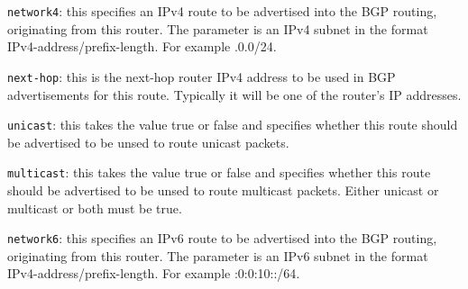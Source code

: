 \begin{description}
\begin{description}
\end{description}
\item{\tt network4}: this specifies an IPv4 route to be advertised
  into the BGP routing, originating from this router.  The parameter
  is an IPv4 subnet in the format IPv4-address/prefix-length.  For
  example {.0.0/24}.
\begin{description}
\item{\tt next-hop}: this is the next-hop router IPv4 address to be used
  in BGP advertisements for this route.  Typically it will be one of
  the router's IP addresses.
\item{\tt unicast}: this takes the value {\stt true} or {\stt false}
and specifies whether this route should be advertised to be unsed to
route unicast packets.
\item{\tt multicast}: this takes the value {\stt true} or {\stt false}
and specifies whether this route should be advertised to be unsed to
route multicast packets.  Either {\stt unicast} or {\stt multicast} or
both must be true.
\end{description}

\item{\tt network6}: this specifies an IPv6 route to be advertised
  into the BGP routing, originating from this router.  The parameter
  is an IPv6 subnet in the format IPv4-address/prefix-length.  For
  example {:0:0:10::/64}.
\end{description}

